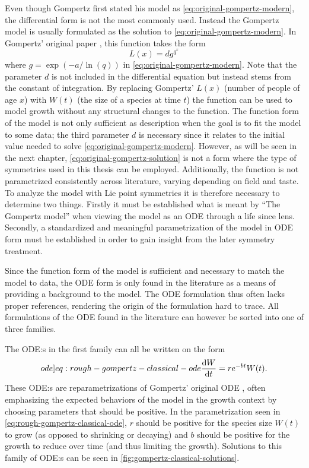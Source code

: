 Even though Gompertz first stated his model as \cref{eq:original-gompertz-modern}, the differential form is not the most commonly used.
Instead the Gompertz model is usually formulated as the solution to \cref{eq:original-gompertz-modern}.
In Gompertz' original paper \cite{gompertz1825nature}, this function takes the form
\begin{equation} \label{eq:original-gompertz-solution}
  L(x) = d g^{q^x}
\end{equation}
where \(g = \exp(-a/\ln\left(q\right))\) in \cref{eq:original-gompertz-modern}.
Note that the parameter \(d\) is not included in the differential equation but instead stems from the constant of integration.
By replacing Gompertz' \(L(x)\) (number of people of age \(x\)) with \(W(t)\) (the size of a species at time \(t\)) the function can be used to model growth without any structural changes to the function.
The function form of the model is not only sufficient as description when the goal is to fit the model to some data; the third parameter \(d\) is necessary since it relates to the initial value needed to solve \cref{eq:original-gompertz-modern}.
However, as will be seen in the next chapter, \cref{eq:original-gompertz-solution} is not a form where the type of symmetries used in this thesis can be employed.
Additionally, the function is not parametrized consistently across literature, varying depending on field and taste.
To analyze the model with Lie point symmetries it is therefore necessary to determine two things.
Firstly it must be established what is meant by \enquote{The Gompertz model} when viewing the model as an ODE through a life since lens.
Secondly, a standardized and meaningful parametrization of the model in ODE form must be established in order to gain insight from the later symmetry treatment.

Since the function form of the model is sufficient and necessary to match the model to data, the ODE form is only found in the literature as a means of providing a background to the model.
The ODE formulation thus often lacks proper references, rendering the origin of the formulation hard to trace.
All formulations of the ODE found in the literature can however be sorted into one of three families.

The ODE:s in the first family can all be written on the form
\begin{equation} \label[ode]{eq:rough-gompertz-classical-ode}
  \diff{W}{t} = r e^{-b t} W(t).
\end{equation}
These ODE:s are reparametrizations of Gompertz' original ODE , often emphasizing the expected behaviors of the model in the growth context by choosing parameters that should be positive.
In the parametrization seen in \cref{eq:rough-gompertz-classical-ode}, \(r\) should be positive for the species size \(W(t)\) to grow (as opposed to shrinking or decaying) and \(b\) should be positive for the growth to reduce over time (and thus limiting the growth).
Solutions to this family of ODE:s can be seen in \cref{fig:gompertz-classical-solutions}.

